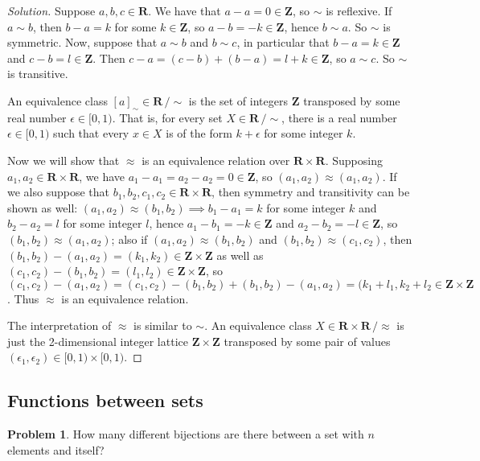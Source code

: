 \documentclass[fontsize=14pt]{scrartcl}
\theoremstyle{definition}
\newtheorem{problem-internal}{Problem}[subsection]
\newenvironment{problem}{
  \medskip
  \begin{problem-internal}
}{
  \end{problem-internal}
}
\newenvironment{solution}{
  \begin{proof}[Solution]
  \vspace{-8px}
  \setlength{\parskip}{4px}
  \setlength{\parindent}{0px}
}{
  \end{proof}
}
\begin{document}
\begin{solution}
Suppose $a,b,c\in\mathbf{R}$. We have that $a-a=0\in\mathbf{Z}$, so $\sim$ is
reflexive. If $a\sim b$, then $b-a=k$ for some $k\in\mathbf{Z}$, so
$a-b=-k\in\mathbf{Z}$, hence $b\sim a$. So $\sim$ is symmetric. Now, suppose that
$a\sim b$ and $b\sim c$, in particular that $b-a=k\in\mathbf{Z}$ and
$c-b=l\in\mathbf{Z}$. Then $c-a=(c-b) + (b-a) = l+k\in\mathbf{Z}$, so $a\sim c$.
So $\sim$ is transitive.

An equivalence class $[a]_{\sim}\in\mathbf{R}\,/\!\sim$ is the set of integers
$\mathbf{Z}$ transposed by some real number $\epsilon\in[0,1)$. That is, for
every set $X\in\mathbf{R}\,/\!\sim$, there is a real number $\epsilon\in[0,1)$
such that every $x\in X$ is of the form $k+\epsilon$ for some integer $k$.

Now we will show that $\approx$ is an equivalence relation over
$\mathbf{R}\times\mathbf{R}$. Supposing $a_1,a_2\in\mathbf{R}\times\mathbf{R}$,
we have $a_1-a_1=a_2-a_2=0\in\mathbf{Z}$, so $(a_1,a_2)\approx(a_1,a_2)$. If we
also suppose that $b_1,b_2,c_1,c_2\in\mathbf{R}\times\mathbf{R}$, then symmetry
and transitivity can be shown as well: $(a_1,a_2)\approx(b_1,b_2)\implies
b_1-a_1=k$ for some integer $k$ and $b_2-a_2=l$ for some integer $l$, hence
$a_1-b_1=-k\in\mathbf{Z}$ and $a_2-b_2=-l\in\mathbf{Z}$, so
$(b_1,b_2)\approx(a_1,a_2)$; also if $(a_1,a_2)\approx(b_1,b_2)$ and
$(b_1,b_2)\approx(c_1,c_2)$, then
$(b_1,b_2)-(a_1,a_2)=(k_1,k_2)\in\mathbf{Z}\times\mathbf{Z}$ as well as
$(c_1,c_2)-(b_1,b_2)=(l_1,l_2)\in\mathbf{Z}\times\mathbf{Z}$, so $(c_1,c_2) -
(a_1,a_2) = (c_1,c_2) - (b_1,b_2) + (b_1,b_2) - (a_1,a_2) = (k_1+l_1,
k_2+l_2\in\mathbf{Z}\times\mathbf{Z}$. Thus $\approx$ is an equivalence
relation.

The interpretation of $\approx$ is similar to $\sim$. An equivalence class
$X\in\mathbf{R}\times\mathbf{R}\,/\approx$ is just the 2-dimensional integer
lattice $\mathbf{Z}\times\mathbf{Z}$ transposed by some pair of values
$(\epsilon_1,\epsilon_2)\in[0,1)\times[0,1)$.
\end{solution}



\subsection{Functions between sets}


\begin{problem}
How many different bijections are there between a set with $n$ elements
and itself?
\end{problem}
\end{document}

